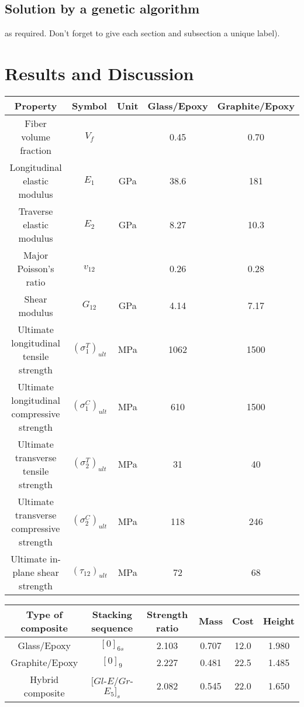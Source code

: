 \documentclass[smallextended]{svjour3}       %
\begin{document}
\subsection{Solution by a genetic algorithm}\label{sec:2}
as required. Don't forget to give each section
and subsection a unique label).




\section{Results and Discussion}

\begin{tabular}{ccccc}
	\toprule
	Property								  & Symbol	   & Unit &  Glass/Epoxy &  Graphite/Epoxy  \\
	\midrule
	Fiber volume fraction					  & $V_f$		      &      &  0.45        &  0.70   \\
	Longitudinal elastic modulus			  & $E_1$		      & GPa  &  38.6        &  181  \\
	Traverse elastic modulus				  & $E_2$		      & GPa  &  8.27        &  10.3  \\
	Major Poisson's ratio					  & $v_{12}$	      &      &  0.26        &  0.28  \\
	Shear modulus							  & $G_{12}$	      & GPa  &  4.14        &  7.17  \\
	Ultimate longitudinal tensile strength    &  $(\sigma_1^T)_{ult}$ & MPa  &  1062        &  1500  \\
	Ultimate longitudinal compressive strength & $(\sigma_1^C)_{ult}$ & MPa  &  610        &  1500  \\
	Ultimate transverse tensile strength    &  $(\sigma_2^T)_{ult}$ & MPa  &  31        &  40 \\
	Ultimate transverse compressive strength & $(\sigma_2^C)_{ult}$ & MPa  &  118        &  246\\
	Ultimate in-plane shear strength          & $(\tau_{12})_{ult}$ & MPa  &  72&  68\\
	\bottomrule
\end{tabular}



\begin{tabular}{cccccc}
	\toprule
	Type of composite & Stacking sequence    & Strength ratio  & Mass &  Cost   & Height\\
	\midrule
	Glass/Epoxy       & $[0]_{6s}$           & 2.103           & 0.707 &  12.0  & 1.980  \\
	Graphite/Epoxy    &  $[0]_9$             & 2.227           & 0.481 &  22.5  & 1.485 \\
	Hybrid composite  &  $[Gl${\text -}$E/Gr${\text -}$E_{5}]_s$ & 2.082           & 0.545 &  22.0  & 1.650 \\
	\bottomrule
\end{tabular}
\end{document}
